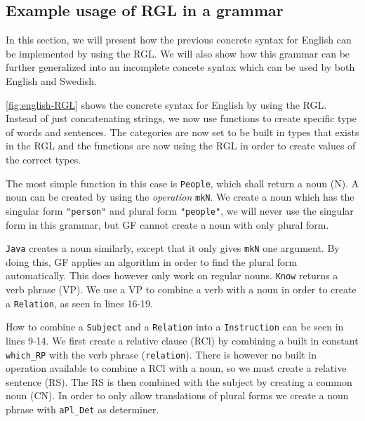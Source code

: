 \subsection{Example usage of RGL in a grammar}

In this section, we will present how the previous concrete syntax for English can be implemented by using the \ac{RGL}. We will also show how this grammar can be further generalized into an incomplete concete syntax which can be used by both English and Swedish.

\autoref{fig:english-RGL} shows the concrete syntax for English by using the RGL. Instead of just concatenating strings, we now use functions to create specific type of words and sentences. The categories are now set to be built in types that exists in the RGL and the functions are now using the RGL in order to create values of the correct types.

The most simple function in this case is \texttt{People}, which shall return a noun (N). A noun can be created by using the \emph{operation} \texttt{mkN}. We create a noun which has the singular form \texttt{"person"} and plural form \texttt{"people"}, we will never use the singular form in this grammar, but GF cannot create a noun with only plural form. 

\texttt{Java} creates a noun similarly, except that it only gives \texttt{mkN} one argument. By doing this, GF applies an algorithm in order to find the plural form automatically. This does however only work on regular nouns. \texttt{Know} returns a verb phrase (VP). We use a VP to combine a verb with a noun in order to create a \texttt{Relation}, as seen in lines 16-19. 

How to combine a \texttt{Subject} and a \texttt{Relation} into a \texttt{Instruction} can be seen in lines 9-14. We first create a relative clause (RCl) by combining a built in constant \texttt{which\_RP} with the verb phrase (\texttt{relation}). There is however no built in operation available to combine a RCl with a noun, so we must create a relative sentence (RS). The RS is then combined with the subject by creating a common noun (CN). In order to only allow translations of plural forms we create a noun phrase with \texttt{aPl\_Det} as determiner.

